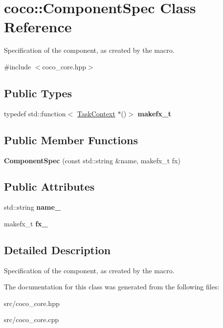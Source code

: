 \hypertarget{classcoco_1_1_component_spec}{}\section{coco\+:\+:Component\+Spec Class Reference}
\label{classcoco_1_1_component_spec}


Specification of the component, as created by the macro.  




{\ttfamily \#include $<$coco\+\_\+core.\+hpp$>$}

\subsection*{Public Types}
\begin{DoxyCompactItemize}
\item 
\hypertarget{classcoco_1_1_component_spec_a3f8ee2e4603484b700fef040758a64e9}{}typedef std\+::function$<$ \hyperlink{classcoco_1_1_task_context}{Task\+Context} $\ast$()$>$ {\bfseries makefx\+\_\+t}\label{classcoco_1_1_component_spec_a3f8ee2e4603484b700fef040758a64e9}

\end{DoxyCompactItemize}
\subsection*{Public Member Functions}
\begin{DoxyCompactItemize}
\item 
\hypertarget{classcoco_1_1_component_spec_a1588367e549ef93c9484084954a44cc7}{}{\bfseries Component\+Spec} (const std\+::string \&name, makefx\+\_\+t fx)\label{classcoco_1_1_component_spec_a1588367e549ef93c9484084954a44cc7}

\end{DoxyCompactItemize}
\subsection*{Public Attributes}
\begin{DoxyCompactItemize}
\item 
\hypertarget{classcoco_1_1_component_spec_a47822521036decc06ea24b6d238980d0}{}std\+::string {\bfseries name\+\_\+}\label{classcoco_1_1_component_spec_a47822521036decc06ea24b6d238980d0}

\item 
\hypertarget{classcoco_1_1_component_spec_ab8f5984058f581717ab0cefc8316094c}{}makefx\+\_\+t {\bfseries fx\+\_\+}\label{classcoco_1_1_component_spec_ab8f5984058f581717ab0cefc8316094c}

\end{DoxyCompactItemize}


\subsection{Detailed Description}
Specification of the component, as created by the macro. 

The documentation for this class was generated from the following files\+:\begin{DoxyCompactItemize}
\item 
src/coco\+\_\+core.\+hpp\item 
src/coco\+\_\+core.\+cpp\end{DoxyCompactItemize}
